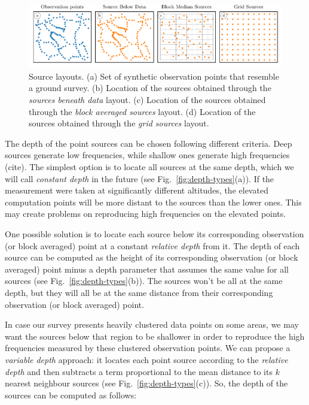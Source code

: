 \documentclass[twocolumn]{article}
\begin{document}
\begin{figure}
    \includegraphics[width=\linewidth]{figs/source-layouts-schematics.pdf}
    \caption{
        Source layouts.
        (a) Set of \SourceLayoutsSchematicsObservations{} synthetic observation
            points that resemble a ground survey.
        (b) Location of the \SourceLayoutsSchematicsSourceBelowData{} sources
            obtained through the \emph{sources beneath data} layout.
        (c) Location of the \SourceLayoutsSchematicsBlockMedianSources{}
            sources obtained through the \emph{block averaged sources} layout.
        (d) Location of the \SourceLayoutsSchematicsGridSources{} sources
            obtained through the \emph{grid sources} layout.
    }
    \label{fig:source-layouts-schematics}
\end{figure}

The depth of the point sources can be chosen following different criteria.
Deep sources generate low frequencies, while shallow ones generate high
frequencies (cite).
The simplest option is to locate all sources at the same depth, which we will
call \emph{constant depth} in the future (see Fig.~\ref{fig:depth-types}(a)).
If the measurement were taken at significantly different altitudes, the
elevated computation points will be more distant to the sources than the lower
ones.
This may create problems on reproducing high frequencies on the elevated
points.

One possible solution is to locate each source below its corresponding
observation (or block averaged) point at a constant \emph{relative depth}
from it.
The depth of each source can be computed as the height of its corresponding
observation (or block averaged) point minus a depth parameter that assumes the
same value for all sources (see Fig.~\ref{fig:depth-types}(b)).
The sources won't be all at the same depth, but they will all be at the same
distance from their corresponding observation (or block averaged) point.

In case our survey presents heavily clustered data points on some areas, we may
want the sources below that region to be shallower in order to reproduce the
high frequencies measured by these clustered observation points.
We can propose a \emph{variable depth} approach: it locates each point source
according to the \emph{relative depth} and then subtracts a term proportional
to the mean distance to its $k$ nearest neighbour sources
(see Fig.~\ref{fig:depth-types}(c)).
So, the depth of the sources can be computed as follows:
\end{document}
